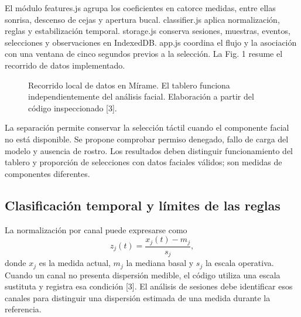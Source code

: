 \documentclass[conference,letterpaper]{IEEEtran}
\begin{document}
El módulo features.js agrupa los coeficientes en catorce medidas, entre ellas sonrisa, descenso de cejas y apertura bucal. classifier.js aplica normalización, reglas y estabilización temporal. storage.js conserva sesiones, muestras, eventos, selecciones y observaciones en IndexedDB. app.js coordina el flujo y la asociación con una ventana de cinco segundos previos a la selección. La Fig. 1 resume el recorrido de datos implementado.

\begin{figure}[ht]
\centering
{}
\caption{Recorrido local de datos en Mírame. El tablero funciona independientemente del análisis facial. Elaboración a partir del código inspeccionado [3].}
\label{fig:flujo}
\end{figure}
La separación permite conservar la selección táctil cuando el componente facial no está disponible. Se propone comprobar permiso denegado, fallo de carga del modelo y ausencia de rostro. Los resultados deben distinguir funcionamiento del tablero y proporción de selecciones con datos faciales válidos; son medidas de componentes diferentes.


\subsection{Clasificación temporal y límites de las reglas}
La normalización por canal puede expresarse como
\begin{equation}
z_j(t)=\frac{x_j(t)-m_j}{s_j},
\end{equation}
donde $x_j$ es la medida actual, $m_j$ la mediana basal y $s_j$ la escala operativa.
Cuando un canal no presenta dispersión medible, el código utiliza una escala sustituta y registra esa condición [3]. El análisis de sesiones debe identificar esos canales para distinguir una dispersión estimada de una medida durante la referencia.
\end{document}

